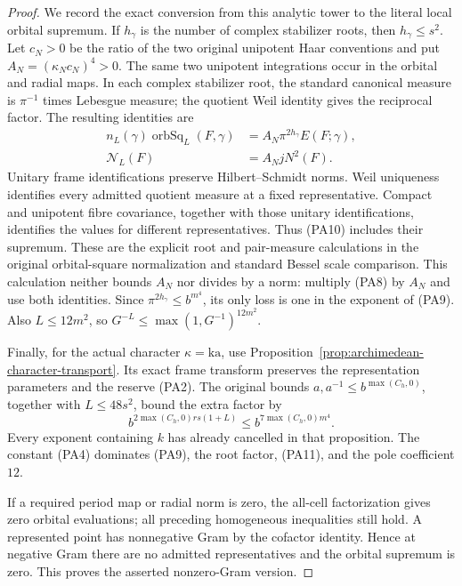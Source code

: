 \begin{proof}
We record the exact conversion from this analytic tower to the
literal local orbital supremum. If \(h_\gamma\) is the number
of complex stabilizer roots, then \(h_\gamma\le s^2\).
Let \(c_N>0\) be the ratio of the two original unipotent Haar
conventions and put \(A_N=(\kappa_Nc_N)^4>0\).
The same two unipotent integrations occur in the orbital and
radial maps. In each complex stabilizer root, the standard
canonical measure is \(\pi^{-1}\) times Lebesgue measure;
the quotient Weil identity gives the reciprocal factor.
The resulting identities are
\[
 \begin{split}
 n_L(\gamma)\operatorname{orbSq}_L(F,\gamma)
      &=A_N\pi^{2h_\gamma}E(F;\gamma),\\
 \mathcal N_L(F)&=A_NjN^2(F).
 \end{split}                                           \tag{PA10}
\]
Unitary frame identifications preserve Hilbert--Schmidt norms.
Weil uniqueness identifies every admitted quotient measure at a
fixed representative. Compact and unipotent fibre covariance,
together with those unitary identifications, identifies the
values for different representatives. Thus (PA10) includes their
supremum. These are the explicit root and pair-measure
calculations in the original orbital-square normalization and
standard Bessel scale comparison.\cite{current-construction-record}
This calculation neither bounds \(A_N\) nor divides by a norm:
multiply (PA8) by \(A_N\) and use both identities.
Since \(\pi^{2h_\gamma}\le b^{m^4}\), its only loss is one
in the exponent of (PA9). Also \(L\le12m^2\), so
\(G^{-L}\le\max(1,G^{-1})^{12m^2}\).

Finally, for the actual character \(\kappa=\mathrm{ka}\), use
Proposition~\ref{prop:archimedean-character-transport}. Its exact
frame transform preserves the representation parameters and the
reserve (PA2). The original bounds
\(a,a^{-1}\le b^{\max(C_h,0)}\), together with \(L\le48s^2\),
bound the extra factor by
\[
 b^{2\max(C_h,0)rs(1+L)}
                  \le b^{7\max(C_h,0)m^4}.             \tag{PA11}
\]
Every exponent containing \(k\) has already cancelled in that
proposition. The constant (PA4) dominates (PA9), the root factor,
(PA11), and the pole coefficient \(12\).

If a required period map or radial norm is zero, the all-cell
factorization gives zero orbital evaluations; all preceding
homogeneous inequalities still hold. A represented point has
nonnegative Gram by the cofactor identity. Hence at negative
Gram there are no admitted representatives and the orbital
supremum is zero. This proves the asserted nonzero-Gram version.
\end{proof}

